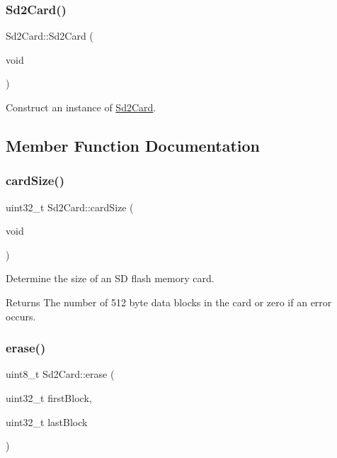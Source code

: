 \subsubsection{\texorpdfstring{Sd2\+Card()}{Sd2Card()}}
{\footnotesize\ttfamily Sd2\+Card\+::\+Sd2\+Card (\begin{DoxyParamCaption}\item[{void}]{ }\end{DoxyParamCaption})\hspace{0.3cm}{\ttfamily [inline]}}

Construct an instance of \hyperlink{class_sd2_card}{Sd2\+Card}. 

\subsection{Member Function Documentation}
\mbox{\label{class_sd2_card_a862473431cc314238bfccdc531a70d3a}} 
\subsubsection{\texorpdfstring{card\+Size()}{cardSize()}}
{\footnotesize\ttfamily uint32\+\_\+t Sd2\+Card\+::card\+Size (\begin{DoxyParamCaption}\item[{void}]{ }\end{DoxyParamCaption})}

Determine the size of an SD flash memory card.

\begin{DoxyReturn}{Returns}
The number of 512 byte data blocks in the card or zero if an error occurs. 
\end{DoxyReturn}
\mbox{\label{class_sd2_card_af49fb720fad1d3ea9f5782da0d87fc0b}} 
\subsubsection{\texorpdfstring{erase()}{erase()}}
{\footnotesize\ttfamily uint8\+\_\+t Sd2\+Card\+::erase (\begin{DoxyParamCaption}\item[{uint32\+\_\+t}]{first\+Block,  }\item[{uint32\+\_\+t}]{last\+Block }\end{DoxyParamCaption})}

